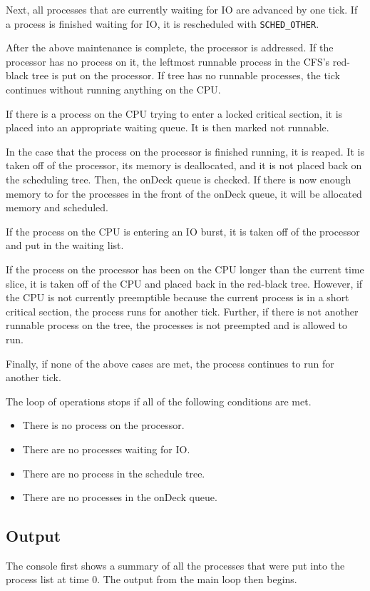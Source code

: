 \documentclass[12pt]{article}
\begin{document}
Next, all processes that are currently waiting for IO are advanced by one tick. If a process is finished waiting for IO, it is rescheduled with \lstinline|SCHED_OTHER|.

After the above maintenance is complete, the processor is addressed. If the processor has no process on it, the leftmost runnable process in the CFS's red-black tree is put on the processor. If tree has no runnable processes, the tick continues without running anything on the CPU.

If there is a process on the CPU trying to enter a locked critical section, it is placed into an appropriate waiting queue. It is then marked not runnable.

In the case that the process on the processor is finished running, it is reaped. It is taken off of the processor, its memory is deallocated, and it is not placed back on the scheduling tree. Then, the onDeck queue is checked. If there is now enough memory to for the processes in the front of the onDeck queue, it will be allocated memory and scheduled.

If the process on the CPU is entering an IO burst, it is taken off of the processor and put in the waiting list.

If the process on the processor has been on the CPU longer than the current time slice, it is taken off of the CPU and placed back in the red-black tree. However, if the CPU is not currently preemptible because the current process is in a short critical section, the process runs for another tick. Further, if there is not another runnable process on the tree, the processes is not preempted and is allowed to run.

Finally, if none of the above cases are met, the process continues to run for another tick. 

The loop of operations stops if all of the following conditions are met.

\singlespacing
\begin{itemize}
\item There is no process on the processor.
\item There are no processes waiting for IO.
\item There are no process in the schedule tree.
\item There are no processes in the onDeck queue.
\end{itemize}
\doublespacing

\subsection{Output}
The console first shows a summary of all the processes that were put into the process list at time 0. The output from the main loop then begins.
\end{document}
